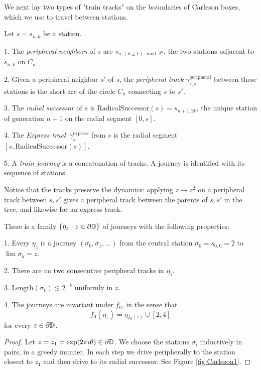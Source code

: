 We next lay two types of "train tracks" on the boundaries of Carleson boxes, which we use to travel between stations.

\begin{definition}
Let $s=s_{n,k}$ be a station.

1. The \emph{peripheral neighbors} of $s$ are $s_{n,\left(k\pm1\right)\mod2^{n}}$,
the two stations adjacent to $s_{n,k}$ on $C_{n}$.

2. Given a peripheral neighbor $s'$ of $s$, the \emph{peripheral
	track }$\gamma_{s,s'}^{\text{peripheral}}$ between these stations
is the short arc of the circle $C_{n}$ connecting $s$ to $s'$.

3. The \emph{radial successor} of $s$ is $\mathrm{RadicalSuccessor}(s)=s_{n+1,2k}$, the unique station of generation $n+1$ on the radial segment $[0,s]$.

4. The \emph{Express track} $\gamma_{s}^{\text{express}}$ from $s$ is the radial segment $[s,\mathrm{RadicalSuccessor}(s)]$.

5. A \emph{train journey} is a concatenation of tracks. A journey is identified with its sequence of stations. %
\end{definition}

Notice that the tracks preserve the dynamics: applying $z\mapsto z^{2}$
on a peripheral track between $s,s'$ gives a peripheral track between the
parents of $s,s'$ in the tree, and likewise for an express track.
 
\begin{lemma}
There is a family $\{\eta_{z}:z\in\partial\mathbb{D}\}$ of journeys with
the following properties:

1. Every $\eta_{z}$ is a journey $\left(\sigma_{0},\sigma_{1},\ldots\right)$
from the central station $\sigma_{0}=s_{0,0}=2$ to $\lim\sigma_{k}=z$.

2. There are no two consecutive peripheral tracks in $\eta_{z}$.

3. $\mathrm{Length}(\sigma_{k})\lesssim2^{-k}$ uniformly in $z$. 

4. The journeys are invariant under $f_{0}$, in the sense that $$f_{0}(\eta_{z})=\eta{}_{f_{0}(z)}\cup[2,4]$$
for every $z\in\partial\mathbb{D}$.
\end{lemma}

\begin{proof}
Let $z=z_{1}=\exp(2\pi i\theta)\in\partial\mathbb{D}$. We choose the stations
$\sigma_{i}$ inductively in pairs, in a greedy manner. In each step
we drive peripherally to the station closest to $z_{1}$ and then
drive to its radial successor. See Figure \ref{fig:Carleson1}. 
\end{proof}


